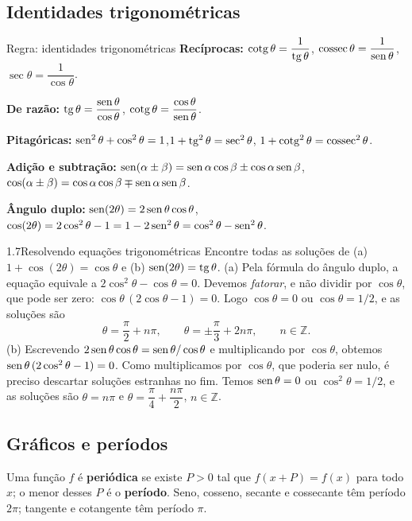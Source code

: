 \subsection{Identidades trigonométricas}

\begin{regra}{Regra: identidades trigonométricas}
\textbf{Recíprocas:} $\operatorname{cotg}\theta=\dfrac1{\operatorname{tg}\theta}$,\; $\operatorname{cossec}\theta=\dfrac1{\operatorname{sen}\theta}$,\;
$\sec\theta=\dfrac1{\cos\theta}$.

\textbf{De razão:} $\operatorname{tg}\theta=\dfrac{\operatorname{sen}\theta}{\cos\theta}$,\;
$\operatorname{cotg}\theta=\dfrac{\cos\theta}{\operatorname{sen}\theta}$.

\textbf{Pitagóricas:} $\operatorname{sen}^2\theta+\cos^2\theta=1$,\quad $1+\operatorname{tg}^2\theta=\sec^2\theta$,\quad
$1+\operatorname{cotg}^2\theta=\operatorname{cossec}^2\theta$.

\textbf{Adição e subtração:}
$\operatorname{sen}(\alpha\pm\beta)=\operatorname{sen}\alpha\cos\beta\pm\cos\alpha\operatorname{sen}\beta$,\quad
$\cos(\alpha\pm\beta)=\cos\alpha\cos\beta\mp\operatorname{sen}\alpha\operatorname{sen}\beta$.

\textbf{Ângulo duplo:} $\operatorname{sen}(2\theta)=2\operatorname{sen}\theta\cos\theta$,\quad
$\cos(2\theta)=2\cos^2\theta-1=1-2\operatorname{sen}^2\theta=\cos^2\theta-\operatorname{sen}^2\theta$.
\end{regra}

\begin{exemplo}{1.7}{Resolvendo equações trigonométricas}
Encontre todas as soluções de (a) $1+\cos(2\theta)=\cos\theta$ e (b) $\operatorname{sen}(2\theta)=\operatorname{tg}\theta$.
\solucao
(a) Pela fórmula do ângulo duplo, a equação equivale a $2\cos^2\theta-\cos\theta=0$.
Devemos \emph{fatorar}, e não dividir por $\cos\theta$, que pode ser zero:
$\cos\theta\,(2\cos\theta-1)=0$. Logo $\cos\theta=0$ ou $\cos\theta=1/2$, e as soluções são
\[
\theta=\frac\pi2+n\pi,\qquad \theta=\pm\frac\pi3+2n\pi,\qquad n\in\mathbb Z.
\]
(b) Escrevendo $2\operatorname{sen}\theta\cos\theta=\operatorname{sen}\theta/\cos\theta$ e multiplicando por
$\cos\theta$, obtemos $\operatorname{sen}\theta\,(2\cos^2\theta-1)=0$. Como multiplicamos por
$\cos\theta$, que poderia ser nulo, é preciso descartar soluções estranhas no fim. Temos
$\operatorname{sen}\theta=0$ ou $\cos^2\theta=1/2$, e as soluções são
$\theta=n\pi$ e $\theta=\dfrac\pi4+\dfrac{n\pi}2$, $n\in\mathbb Z$.
\end{exemplo}

\subsection{Gráficos e períodos}

Uma função $f$ é \textbf{periódica} se existe $P>0$ tal que $f(x+P)=f(x)$ para todo $x$; o
menor desses $P$ é o \textbf{período}. Seno, cosseno, secante e cossecante têm período
$2\pi$; tangente e cotangente têm período $\pi$.


